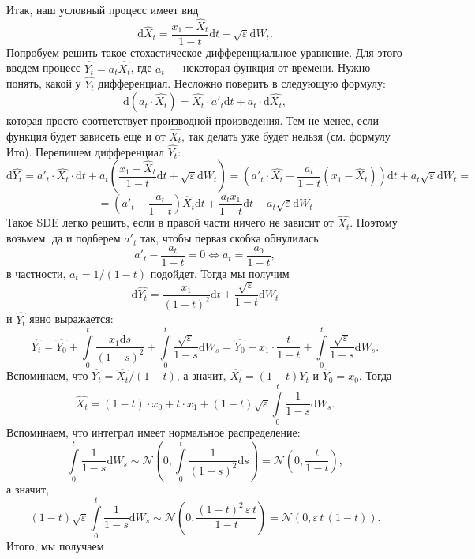 \documentclass[12pt]{article}
\theoremstyle{definition}
\begin{document}
Итак, наш условный процесс имеет вид
\[
    \mathrm{d} \hat{X}_t = \frac{x_1 - \hat{X}_t}{1 - t} \mathrm{d} t + \sqrt{\varepsilon} \mathrm{d} W_t.
\]
Попробуем решить такое стохастическое дифференциальное уравнение. Для этого введем процесс $\hat{Y_t} = a_t \hat{X_t}$, где $a_t$ --- некоторая функция от времени. Нужно понять, какой у $\hat{Y_t}$ дифференциал. Несложно поверить в следующую формулу:
\[
    \mathrm{d} \left(a_t \cdot \hat{X_t}\right) = \hat{X_t} \cdot a'_t \mathrm{d} t + a_t \cdot \mathrm{d} \hat{X_t},
\]
которая просто соответствует производной произведения. Тем не менее, если функция будет зависеть еще и от $\hat{X_t}$, так делать уже будет нельзя (см. формулу Ито). Перепишем дифференциал $\hat{Y_t}$:
\[
    \mathrm{d} \hat{Y_t} = a'_t \cdot \hat{X_t} \cdot \mathrm{d} t + a_t \left(\frac{x_1 - \hat{X}_t}{1 - t} \mathrm{d} t + \sqrt{\varepsilon} \mathrm{d} W_t \right) = \left(a'_t \cdot \hat{X_t} + \frac{a_t}{1 - t} (x_1 - \hat{X}_t)\right)\mathrm{d} t + a_t\sqrt{\varepsilon} \mathrm{d} W_t=
\]
\[
    = \left(a'_t - \frac{a_t}{1-t}\right)\hat{X}_t \mathrm{d} t + \frac{a_t x_1}{1 - t}\mathrm{d} t + a_t \sqrt{\varepsilon}\mathrm{d} W_t
\]
Такое SDE легко решить, если в правой части ничего не зависит от $\hat{X_t}$. Поэтому возьмем, да и подберем $a'_t$ так, чтобы первая скобка обнулилась:
\[
    a'_t - \frac{a_t}{1 - t} = 0 \iff a_t = \frac{a_0}{1 - t},
\]
в частности, $a_t = 1 / (1 - t)$ подойдет. Тогда мы получим
\[
    \mathrm{d} \hat{Y_t} = \frac{x_1}{(1 - t)^2}\mathrm{d} t + \frac{\sqrt{\varepsilon}}{1 - t} \mathrm{d} W_t
\]
и $\hat{Y_t}$ явно выражается:
\[
    \hat{Y_t} = \hat{Y_0} + \int \limits_{0}^{t} \frac{x_1\mathrm{d}s}{(1 - s)^2} + \int\limits_{0}^{t} \frac{\sqrt{\varepsilon}}{1 - s} \mathrm{d} W_s = \hat{Y_0} + x_1 \cdot \frac{t}{1 - t} + \int\limits_{0}^{t}\frac{\sqrt{\varepsilon}}{1 - s} \mathrm{d} W_s.
\]
Вспоминаем, что $\hat{Y_t} = \hat{X_t} / (1 - t)$, а значит, $\hat{X_t} = (1 - t)Y_t$ и $\hat{Y}_0 = x_0$. Тогда
\[
    \hat{X_t} = (1 - t) \cdot x_0 + t  \cdot x_1 + (1 - t)\sqrt{\varepsilon}\int\limits_{0}^{t}\frac{1}{1 - s}\mathrm{d}W_s.
\]
Вспоминаем, что интеграл имеет нормальное распределение:
\[
    \int \limits_{0}^{t} \frac{1}{1 - s}\mathrm{d} W_s \sim \mathcal{N}\left(0, \int \limits_{0}^{t} \frac{1}{(1 - s)^2}\mathrm{d} s \right) = \mathcal{N}\left(0, \frac{t}{1 - t}\right),
\]
а значит, 
\[
    (1 - t)\sqrt{\varepsilon}\int\limits_{0}^{t} \frac{1}{1 - s}\mathrm{d} W_s \sim \mathcal{N}\left(0, \frac{(1 - t)^2 \, \varepsilon \, t}{1 - t}\right) = \mathcal{N}\left(0, \varepsilon\, t \,(1 - t)\right).
\]
Итого, мы получаем
\end{document}
